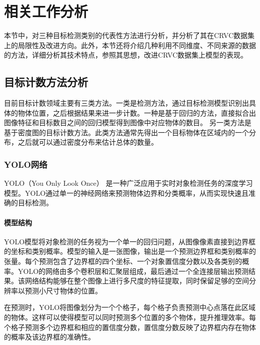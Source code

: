 
\chapter{相关工作分析}

本节中，对三种目标检测类别的代表性方法进行分析，并分析了其在CRVC数据集上的局限性及改进方向。此外，本节还将介绍几种利用不同维度、不同来源的数据的方法，详细分析其技术特点，参照其思想，改进CRVC数据集上模型的表现。

\section{目标计数方法分析}
目前目标计数领域主要有三类方法。一类是检测方法\cite{girshick2014rich,girshick2015fast,ren2015faster,redmon2016you,redmon2017yolo9000,he2017mask}，通过目标检测模型识别出具体的物体位置，之后根据结果来进一步计数。一种是基于回归的方法\cite{2009BayesianPoissonRegressionCrowdCounting,2013MultisourceMultiscaleCountingExtremelyDenseCrowdImages,2009CrowdCountingUsingMultipleLocalFeatures}，直接拟合出图像特征和目标数目之间的回归模型得到图像中对应物体的数目。
另一类方法是基于密度图的目标计数方法\cite{li2018csrnet,2016SingleImageCrowdCountingMultiColumnConvolutionalNeuralNetwork,2018CrowdCountingusingDeepRecurrentSpatialAwareNetwork,2018VehicleDetectionCountingHighResolutionAerialImagesUsingConvolutionalRegressionNeuralNetwork}。此类方法通常先得出一个目标物体在区域内的一个分布，之后就可以通过密度分布来估计总体的数量。
\subsection{YOLO网络}
YOLO（You Only Look Once）
\cite{redmon2016you}是一种广泛应用于实时对象检测任务的深度学习模型。YOLO通过单一的神经网络来预测物体边界和分类概率，从而实现快速且准确的目标检测。

\subsubsection{模型结构}
YOLO模型将对象检测的任务视为一个单一的回归问题，从图像像素直接到边界框的坐标和类别概率。模型的输入是一张图像，输出是一个预测边界框和类别概率的张量。每个预测包含了边界框的四个坐标、一个对象置信度分数以及各类别的概率。YOLO的网络由多个卷积层和汇聚层组成，最后通过一个全连接层输出预测结果。该网络结构能够在整个图像上进行多尺度的特征提取，同时保留足够的空间分辨率以预测小尺寸物体的位置。

在预测时，YOLO将图像划分为一个个格子，每个格子负责预测中心点落在此区域的物体。这样可以使得模型可以同时预测多个位置的多个物体，提升推理效率。每个格子预测多个边界框和相应的置信度分数，置信度分数反映了边界框内存在物体的概率及该边界框的准确性。


